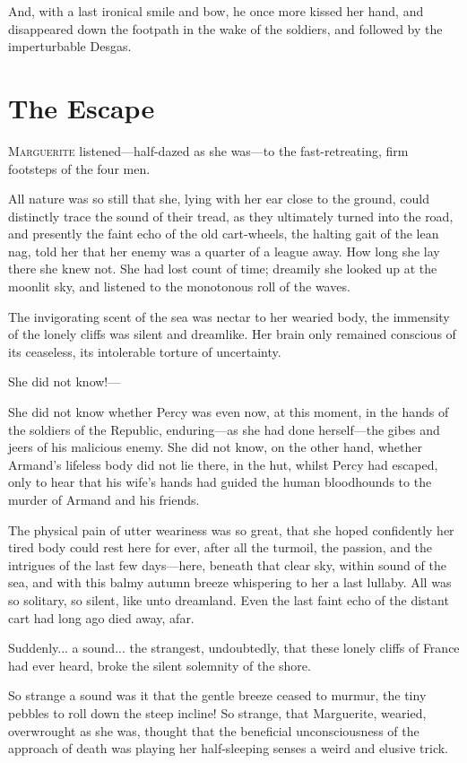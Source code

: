 \documentclass[paper=5.5in:8.5in,BCOR=7mm,twoside,DIV=calc,12pt,usegeometry,chapterprefix,endperiod,headings=big]{scrbook}
\begin{document}
And, with a last ironical smile and bow, he once more kissed her hand, and disappeared down the footpath in the wake of the soldiers, and followed by the imperturbable Desgas.

\chapter{The Escape}
\lettrine[lines=4]{M}{arguerite} listened---half-dazed as she was---to the fast-retreating, firm footsteps of the four men.

All nature was so still that she, lying with her ear close to the ground, could distinctly trace the sound of their tread, as they ultimately turned into the road, and presently the faint echo of the old cart-wheels, the halting gait of the lean nag, told her that her enemy was a quarter of a league away. How long she lay there she knew not. She had lost count of time; dreamily she looked up at the moonlit sky, and listened to the monotonous roll of the waves.

The invigorating scent of the sea was nectar to her wearied body, the immensity of the lonely cliffs was silent and dreamlike. Her brain only remained conscious of its ceaseless, its intolerable torture of uncertainty.

She did not know!---

She did not know whether Percy was even now, at this moment, in the hands of the soldiers of the Republic, enduring---as she had done herself---the gibes and jeers of his malicious enemy. She did not know, on the other hand, whether Armand's lifeless body did not lie there, in the hut, whilst Percy had escaped, only to hear that his wife's hands had guided the human bloodhounds to the murder of Armand and his friends.

The physical pain of utter weariness was so great, that she hoped confidently her tired body could rest here for ever, after all the turmoil, the passion, and the intrigues of the last few days---here, beneath that clear sky, within sound of the sea, and with this balmy autumn breeze whispering to her a last lullaby. All was so solitary, so silent, like unto dreamland. Even the last faint echo of the distant cart had long ago died away, afar.

Suddenly... a sound... the strangest, undoubtedly, that these lonely cliffs of France had ever heard, broke the silent solemnity of the shore.

So strange a sound was it that the gentle breeze ceased to murmur, the tiny pebbles to roll down the steep incline! So strange, that Marguerite, wearied, overwrought as she was, thought that the beneficial unconsciousness of the approach of death was playing her half-sleeping senses a weird and elusive trick.
\end{document}
